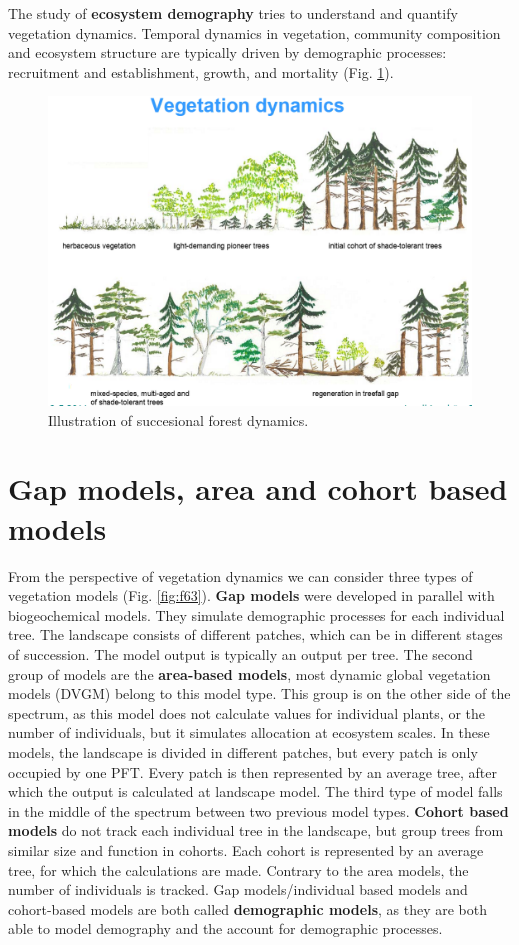 \documentclass[12pt,oneside]{book}
\begin{document}
The study of \textbf{ecosystem demography} tries to understand and
quantify vegetation dynamics. Temporal dynamics in vegetation, community
composition and ecosystem structure are typically driven by demographic
processes: recruitment and establishment, growth, and mortality (Fig.
\ref{fig:f62}).

\begin{figure}

{\centering \includegraphics[width=0.8\linewidth]{figures/chap6/f62_demography} 

}

\caption{Illustration of succesional forest dynamics.}\label{fig:f62}
\end{figure}

\section{Gap models, area and cohort based
models}\label{gap-models-area-and-cohort-based-models}

From the perspective of vegetation dynamics we can consider three types
of vegetation models (Fig. \ref{fig:f63}). \textbf{Gap models} were
developed in parallel with biogeochemical models. They simulate
demographic processes for each individual tree. The landscape consists
of different patches, which can be in different stages of succession.
The model output is typically an output per tree. The second group of
models are the \textbf{area-based models}, most dynamic global
vegetation models (DVGM) belong to this model type. This group is on the
other side of the spectrum, as this model does not calculate values for
individual plants, or the number of individuals, but it simulates
allocation at ecosystem scales. In these models, the landscape is
divided in different patches, but every patch is only occupied by one
PFT. Every patch is then represented by an average tree, after which the
output is calculated at landscape model. The third type of model falls
in the middle of the spectrum between two previous model types.
\textbf{Cohort based models} do not track each individual tree in the
landscape, but group trees from similar size and function in cohorts.
Each cohort is represented by an average tree, for which the
calculations are made. Contrary to the area models, the number of
individuals is tracked. Gap models/individual based models and
cohort-based models are both called \textbf{demographic models}, as they
are both able to model demography and the account for demographic
processes.
\end{document}
